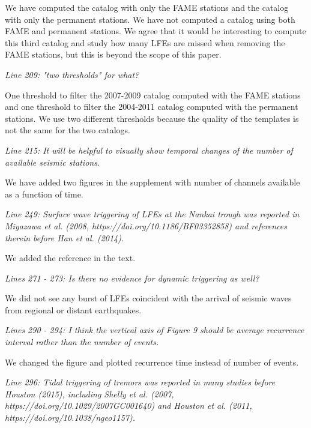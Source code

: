 \documentclass[letterpaper, 12pt]{article}
\begin{document}
\bigskip

We have computed the catalog with only the FAME stations and the catalog with only the permanent stations. We have not computed a catalog using both FAME and permanent stations. We agree that it would be interesting to compute this third catalog and study how many LFEs are missed when removing the FAME stations, but this is beyond the scope of this paper.

\bigskip

\textit{Line 209: "two thresholds" for what?}

\bigskip

One threshold to filter the 2007-2009 catalog computed with the FAME stations and one threshold to filter the 2004-2011 catalog computed with the permanent stations. We use two different thresholds because the quality of the templates is not the same for the two catalogs.

\bigskip

\textit{Line 215: It will be helpful to visually show temporal changes of the number of available seismic stations.}

\bigskip

We have added two figures in the supplement with number of channels available as a function of time.

\bigskip

\textit{Line 249: Surface wave triggering of LFEs at the Nankai trough was reported in Miyazawa et al. (2008, https://doi.org/10.1186/BF03352858) and references therein before Han et al. (2014).}

\bigskip

We added the reference in the text.

\bigskip

\textit{Lines 271 - 273: Is there no evidence for dynamic triggering as well?}

\bigskip

We did not see any burst of LFEs coincident with the arrival of seismic waves from regional or distant earthquakes.

\bigskip

\textit{Lines 290 - 294: I think the vertical axis of Figure 9 should be average recurrence interval rather than the number of events.}

\bigskip

We changed the figure and plotted recurrence time instead of number of events.

\bigskip

\textit{Line 296: Tidal triggering of tremors was reported in many studies before Houston (2015), including Shelly et al. (2007, https://doi.org/10.1029/2007GC001640) and Houston et al. (2011, https://doi.org/10.1038/ngeo1157).}
\end{document}

